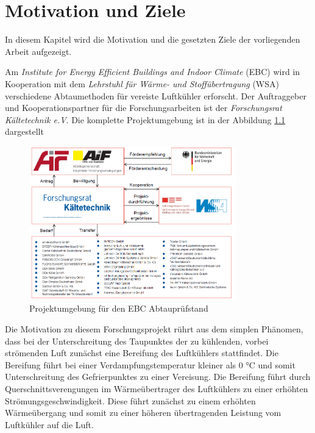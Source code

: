 \chapter{Motivation und Ziele}
\label{cha:Motivation_und_Ziele}

In diesem Kapitel wird die Motivation und die gesetzten Ziele der vorliegenden  Arbeit aufgezeigt.

Am \textit{Institute for Energy Efficient Buildings and Indoor Climate }(EBC) wird in Kooperation mit dem \textit{Lehrstuhl für Wärme- und Stoffübertragung }(WSA) verschiedene Abtaumethoden für vereiste Luftkühler erforscht. Der Auftraggeber und Kooperationspartner für die Forschungsarbeiten ist der \textit{Forschungsrat Kältetechnik e.V}. Die komplette Projektumgebung ist in der Abbildung \ref{fig:Projektumgebung} dargestellt

\begin{figure}[htb]
	\centering
		\includegraphics[width=0.80\textwidth]{Pictures/Projektumgebung.png}
	\caption{Projektumgebung für den EBC Abtauprüfstand \citep{Freitag2015}}
	\label{fig:Projektumgebung}
\end{figure}

Die Motivation zu diesem Forschungsprojekt rührt aus dem simplen Phänomen, dass bei der Unterschreitung des Taupunktes der zu kühlenden, vorbei strömenden Luft zunächst eine Bereifung des Luftkühlers stattfindet. Die Bereifung führt bei einer Verdampfungstemperatur kleiner als 0 $°$C und somit Unterschreitung des Gefrierpunktes zu einer Vereisung. Die Bereifung führt durch Querschnittsverengungen im Wärmeübertrager des Luftkühlers zu einer erhöhten Strömungsgeschwindigkeit. Diese führt zunächst zu einem erhöhten Wärmeübergang und somit zu einer höheren übertragenden Leistung vom Luftkühler auf die Luft.\citep{Schydlo2010} 

